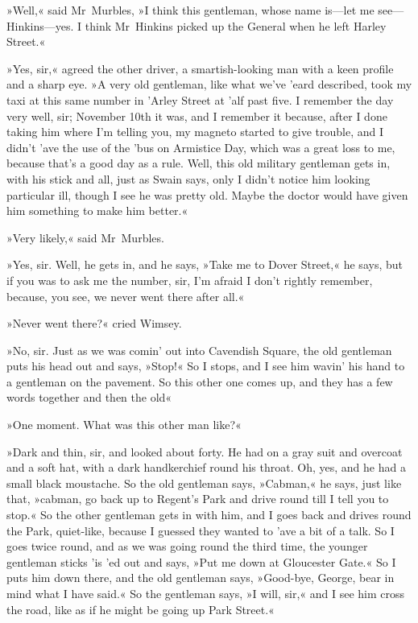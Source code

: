 »Well,« said Mr~Murbles, »I think this gentleman, whose name is—let me see—Hinkins—yes. I think Mr~Hinkins picked up the General when he left Harley Street.«

»Yes, sir,« agreed the other driver, a smartish-looking man with a keen profile and a sharp eye. »A very old gentleman, like what we've 'eard described, took my taxi at this same number in 'Arley Street at 'alf past five. I remember the day very well, sir; November  10th it was, and I remember it because, after I done taking him where I'm telling you, my magneto started to give trouble, and I didn't 'ave the use of the 'bus on Armistice Day, which was a great loss to me, because that's a good day as a rule. Well, this old military gentleman gets in, with his stick and all, just as Swain says, only I didn't notice him looking particular ill, though I see he was pretty old. Maybe the doctor would have given him something to make him better.«

»Very likely,« said Mr~Murbles.

»Yes, sir. Well, he gets in, and he says, »Take me to Dover Street,« he says, but if you was to ask me the number, sir, I'm afraid I don't rightly remember, because, you see, we never went there after all.«

»Never went there?« cried Wimsey.

»No, sir. Just as we was comin' out into Cavendish Square, the old gentleman puts his head out and says, »Stop!« So I stops, and I see him wavin' his hand to a gentleman on the pavement. So this other one comes up, and they has a few words together and then the old\longdash«

»One moment. What was this other man like?«

»Dark and thin, sir, and looked about forty. He had on a gray suit and overcoat and a soft hat, with a dark handkerchief round his throat. Oh, yes, and he had a small black moustache. So the old gentleman says, »Cabman,« he says, just like that, »cabman, go back up to Regent's Park and drive round till I tell you to stop.« So the other gentleman gets in with him, and I goes back and drives round the Park, quiet-like, because I guessed they wanted to 'ave a bit of a talk. So I goes twice round, and as we was going round the third time, the younger gentleman sticks 'is 'ed out and says, »Put me down at Gloucester Gate.« So I puts him down there, and the old gentleman says, »Good-bye, George, bear in mind what I have said.« So the gentleman says, »I will, sir,« and I see him cross the road, like as if he might be going up Park Street.«

